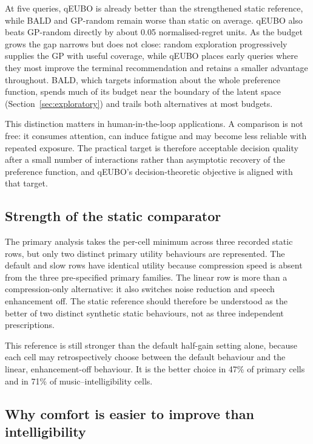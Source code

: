 \documentclass[preprint,12pt]{elsarticle}
\begin{document}
At five queries, qEUBO is already better than the strengthened static reference, while BALD and GP-random remain worse than static on average. qEUBO also beats GP-random directly by about 0.05 normalised-regret units. As the budget grows the gap narrows but does not close: random exploration progressively supplies the GP with useful coverage, while qEUBO places early queries where they most improve the terminal recommendation and retains a smaller advantage throughout. BALD, which targets information about the whole preference function, spends much of its budget near the boundary of the latent space (Section~\ref{sec:exploratory}) and trails both alternatives at most budgets.

This distinction matters in human-in-the-loop applications. A comparison is not free: it consumes attention, can induce fatigue and may become less reliable with repeated exposure. The practical target is therefore acceptable decision quality after a small number of interactions rather than asymptotic recovery of the preference function, and qEUBO's decision-theoretic objective is aligned with that target.

\subsection{Strength of the static comparator}

The primary analysis takes the per-cell minimum across three recorded static rows, but only two distinct primary utility behaviours are represented. The default and slow rows have identical utility because compression speed is absent from the three pre-specified primary families. The linear row is more than a compression-only alternative: it also switches noise reduction and speech enhancement off. The static reference should therefore be understood as the better of two distinct synthetic static behaviours, not as three independent prescriptions.

This reference is still stronger than the default half-gain setting alone, because each cell may retrospectively choose between the default behaviour and the linear, enhancement-off behaviour. It is the better choice in 47\% of primary cells and in 71\% of music--intelligibility cells.

\subsection{Why comfort is easier to improve than intelligibility}
\end{document}
